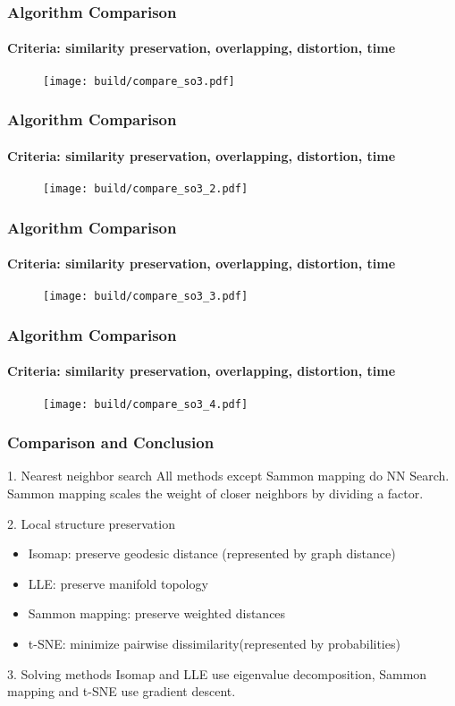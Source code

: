 \documentclass{beamer}
\begin{document}
\begin{frame}
  \frametitle{Algorithm Comparison}
  \framesubtitle{Criteria: similarity preservation, overlapping, distortion, time}
  \begin{figure}
    \centering
    \texttt{[image: build/compare\_so3.pdf]}
  \end{figure}
\end{frame}
\begin{frame}
  \frametitle{Algorithm Comparison}
  \framesubtitle{Criteria: similarity preservation, overlapping, distortion, time}
  \begin{figure}
    \centering
    \texttt{[image: build/compare\_so3\_2.pdf]}
  \end{figure}
\end{frame}
\begin{frame}
  \frametitle{Algorithm Comparison}
  \framesubtitle{Criteria: similarity preservation, overlapping, distortion, time}
  \begin{figure}
    \centering
    \texttt{[image: build/compare\_so3\_3.pdf]}
  \end{figure}
\end{frame}
\begin{frame}
  \frametitle{Algorithm Comparison}
  \framesubtitle{Criteria: similarity preservation, overlapping, distortion, time}
  \begin{figure}
    \centering
    \texttt{[image: build/compare\_so3\_4.pdf]}
  \end{figure}
\end{frame}

% 
% 
% 
% 
% 
%
\begin{frame}
  \frametitle{Comparison and Conclusion}

  \begin{block}{1. Nearest neighbor search}
    All methods except Sammon mapping do NN Search. Sammon mapping scales the weight of closer neighbors by dividing a factor.
  \end{block}

  \begin{block}{2. Local structure preservation}
    \begin{itemize}
      \item Isomap: preserve geodesic distance (represented by graph distance)
      \item LLE: preserve manifold topology
      \item Sammon mapping: preserve weighted distances 
      \item t-SNE: minimize pairwise dissimilarity(represented by probabilities)
    \end{itemize}
  \end{block}

  \begin{block}{3. Solving methods}
    Isomap and LLE use eigenvalue decomposition, Sammon mapping and t-SNE use gradient descent.
  \end{block}
    
\end{frame}
\end{document}

